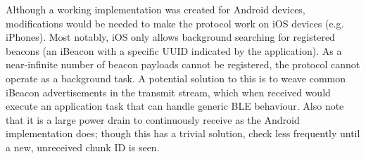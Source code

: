 \documentclass[conference]{IEEEtran} %
\begin{document}
Although a working implementation was created for Android devices, modifications would be needed to make the protocol work on iOS devices (e.g. iPhones). Most notably, iOS only allows background searching for registered beacons (an iBeacon with a specific UUID indicated by the application). As a near-infinite number of beacon payloads cannot be registered, the protocol cannot operate as a background task. A potential solution to this is to weave common iBeacon advertisements in the transmit stream, which when received would execute an application task that can handle generic BLE behaviour. Also note that it is a large power drain to continuously receive as the Android implementation does; though this has a trivial solution, check less frequently until a new, unreceived chunk ID is seen.




\end{document}
